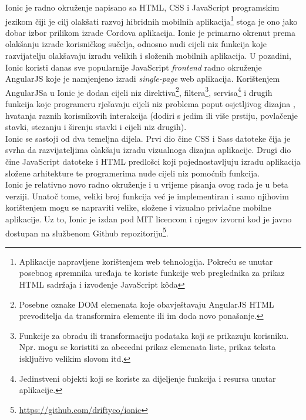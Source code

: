 Ionic je radno okruženje napisano sa HTML, CSS i JavaScript programskim jezikom čiji je cilj olakšati razvoj hibridnih mobilnih aplikacija\footnote{Aplikacije napravljene korištenjem web tehnologija. 
Pokreću se unutar posebnog spremnika uređaja te koriste funkcije web preglednika za prikaz HTML sadržaja i izvođenje JavaScript k\^oda} stoga je ono jako dobar izbor prilikom izrade Cordova aplikacija. 
Ionic je primarno okrenut prema olakšanju izrade korisničkog sučelja, odnosno nudi cijeli niz funkcija koje razvijatelju olakšavaju izradu velikih i složenih mobilnih aplikacija. 
U pozadini, Ionic koristi danas sve popularnije JavaScript \textit{frontend} radno okruženje AngularJS koje je namjenjeno izradi \textit{single-page} web aplikacija. 
Korištenjem AngularJSa u Ionic je dodan cijeli niz direktiva\footnote{Posebne oznake DOM elemenata koje obavještavaju AngularJS HTML prevoditelja da transformira elemente ili im doda novo ponašanje.}, filtera\footnote{Funkcije za obradu ili transformaciju podataka koji se prikazuju korisniku. 
Npr. mogu se koristiti za abecedni prikaz elemenata liste, prikaz teksta isključivo velikim slovom itd.}, servisa\footnote{Jedinstveni objekti  koji se koriste za dijeljenje funkcija i resursa unutar aplikacije.} i drugih funkcija koje programeru rješavaju cijeli niz problema poput osjetljivog dizajna , hvatanja raznih korisnikovih interakcija (dodiri s jedim ili više prstiju, povlačenje  stavki, stezanju i širenju stavki  i cijeli niz drugih). 
\\

Ionic se sastoji od dva temeljna dijela. 
Prvi dio čine CSS i Sass datoteke čija je svrha da razvijateljima olakšaju izradu vizualnoga dizajna aplikacije. 
Drugi dio čine JavaScript datoteke i HTML predlošci koji pojednostavljuju izradu aplikacija složene arhitekture te programerima nude cijeli niz pomoćnih funkcija.
\\

Ionic je relativno novo radno okruženje i u vrijeme pisanja ovog rada je u beta verziji. 
Unatoč tome, veliki broj funkcija već je implementiran i samo njihovim korištenjem mogu se napraviti velike, složene i vizualno privlačne mobilne aplikacije. 
Uz to, Ionic je izdan pod MIT licencom i njegov izvorni kod je javno dostupan na službenom Github repozitoriju\footnote{\url{https://github.com/driftyco/ionic}}.